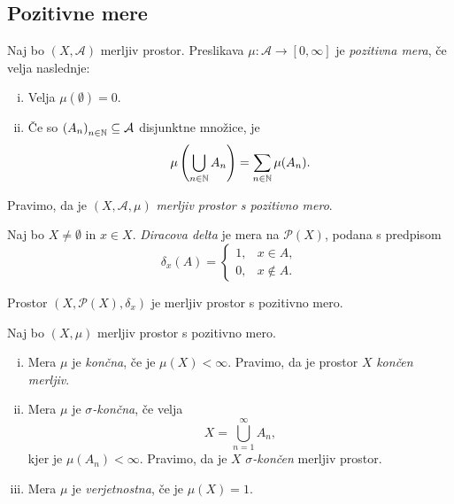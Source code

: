 \obvs

\newpage

\subsection{Pozitivne mere}

\begin{definicija}
Naj bo $(X, \mathcal{A})$ merljiv prostor. Preslikava
$\mu \colon \mathcal{A} \to [0, \infty]$ je
\emph{pozitivna mera}, če velja naslednje:

\begin{enumerate}[i)]
\item Velja $\mu(\emptyset) = 0$.
\item Če so $\left(A_n\right)_{n \in \mathbb{N}} \subseteq \mathcal{A}$ disjunktne
množice, je
\[
\mu \left(\bigcup_{n \in \mathbb{N}} A_n\right) = \sum_{n \in \mathbb{N}} \mu(A_n).
\]
\end{enumerate}

Pravimo, da je $(X, \mathcal{A}, \mu)$
\emph{merljiv prostor s pozitivno mero}.
\end{definicija}

\begin{definicija}
Naj bo $X \ne \emptyset$ in $x \in X$.
\emph{Diracova delta} je mera na
$\mathcal{P}(X)$, podana s predpisom
\[
\delta_x(A) =
\begin{cases}
1, & x \in A, \\
0, & x \not \in A.
\end{cases}
\]
\end{definicija}

\begin{opomba}
Prostor $(X, \mathcal{P}(X), \delta_x)$ je merljiv prostor s
pozitivno mero.
\end{opomba}

\begin{definicija}
Naj bo $(X, \mu)$ merljiv prostor s pozitivno mero.

\begin{enumerate}[i)]
\item Mera $\mu$ je \emph{končna}, če
je $\mu(X) < \infty$. Pravimo, da je prostor $X$
\emph{končen merljiv}.
\item Mera $\mu$ je
\emph{$\sigma$-končna},
če velja
\[
X = \bigcup_{n=1}^\infty A_n,
\]
kjer je $\mu(A_n) < \infty$. Pravimo, da je $X$
\emph{$\sigma$-končen}
merljiv prostor.
\item Mera $\mu$ je \emph{verjetnostna},
če je $\mu(X) = 1$.
\end{enumerate}
\end{definicija}

